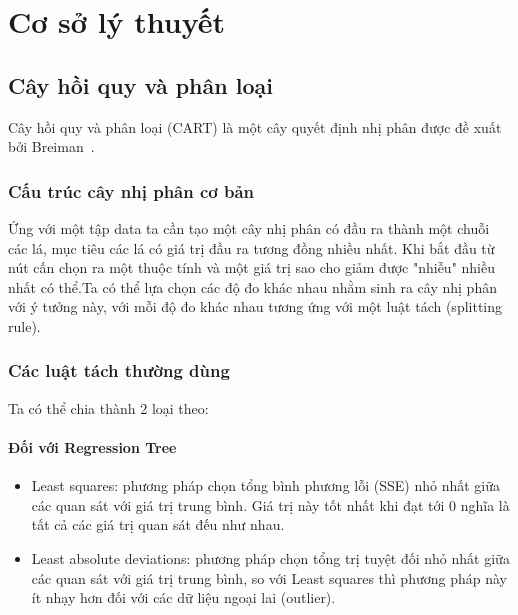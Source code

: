 \chapter{Cơ sở lý thuyết} 

\section{Cây hồi quy và phân loại}
Cây hồi quy và phân loại (CART) là một cây quyết định nhị phân được đề xuất bởi Breiman~\cite{23}.\\

\subsection{Cấu trúc cây nhị phân cơ bản}
 Ứng  với một tập data ta cần tạo một  cây nhị phân có đầu ra thành một chuỗi các lá, mục tiêu các lá có giá trị đầu ra tương đồng nhiều nhất. Khi bắt đầu từ nút cấn chọn ra một thuộc tính và một giá trị sao cho giảm được "nhiễu" nhiều nhất có thể.Ta có thể lựa chọn các độ đo khác nhau nhằm sinh ra cây nhị phân với ý tưởng này, với mỗi độ đo khác nhau tương ứng với một luật tách (splitting rule).\\
\subsection{Các luật tách thường dùng} Ta có thể chia thành 2 loại theo:
\subsubsection{Đối với Regression Tree}
\begin{itemize}
\item Least squares: phương pháp chọn tổng bình phương lỗi (SSE) nhỏ nhất giữa các quan sát với giá trị trung bình. Giá trị này tốt nhất khi đạt tới 0 nghĩa là tất cả các giá trị quan sát đếu như nhau.
\item Least absolute deviations: phương pháp chọn tổng  trị tuyệt đối nhỏ nhất giữa các quan sát với giá trị trung bình, so với Least squares thì phương pháp này ít nhạy hơn đối với các dữ liệu ngoại lai (outlier). 
\end{itemize}
